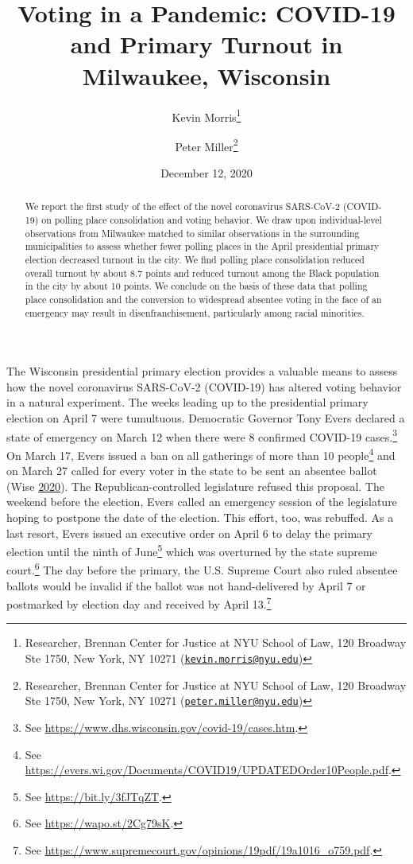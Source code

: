 \documentclass[
  12pt,
]{article}
\title{Voting in a Pandemic: COVID-19 and Primary Turnout in Milwaukee, Wisconsin}
\author{Kevin Morris\footnote{Researcher, Brennan Center for Justice at NYU School of Law, 120 Broadway Ste 1750, New York, NY 10271 (\href{mailto:kevin.morris@nyu.edu}{\nolinkurl{kevin.morris@nyu.edu}})} \and Peter Miller\footnote{Researcher, Brennan Center for Justice at NYU School of Law, 120 Broadway Ste 1750, New York, NY 10271 (\href{mailto:peter.miller@nyu.edu}{\nolinkurl{peter.miller@nyu.edu}})}}
\date{December 12, 2020}
\begin{document}
\maketitle
\begin{abstract}
We report the first study of the effect of the novel coronavirus SARS-CoV-2 (COVID-19) on polling place consolidation and voting behavior. We draw upon individual-level observations from Milwaukee matched to similar observations in the surrounding municipalities to assess whether fewer polling places in the April presidential primary election decreased turnout in the city. We find polling place consolidation reduced overall turnout by about 8.7 points and reduced turnout among the Black population in the city by about 10 points. We conclude on the basis of these data that polling place consolidation and the conversion to widespread absentee voting in the face of an emergency may result in disenfranchisement, particularly among racial minorities.
\end{abstract}

\pagebreak

\doublespacing

The Wisconsin presidential primary election provides a valuable means to assess how the novel coronavirus SARS-CoV-2 (COVID-19) has altered voting behavior in a natural experiment. The weeks leading up to the presidential primary election on April 7 were tumultuous. Democratic Governor Tony Evers declared a state of emergency on March 12 when there were 8 confirmed COVID-19 cases.\footnote{See \url{https://www.dhs.wisconsin.gov/covid-19/cases.htm}.} On March 17, Evers issued a ban on all gatherings of more than 10 people\footnote{See \url{https://evers.wi.gov/Documents/COVID19/UPDATEDOrder10People.pdf}.} and on March 27 called for every voter in the state to be sent an absentee ballot (Wise \protect\hyperlink{ref-Wise2020}{2020}). The Republican-controlled legislature refused this proposal. The weekend before the election, Evers called an emergency session of the legislature hoping to postpone the date of the election. This effort, too, was rebuffed. As a last resort, Evers issued an executive order on April 6 to delay the primary election until the ninth of June\footnote{See \url{https://bit.ly/3fJTqZT}.} which was overturned by the state supreme court.\footnote{See \url{https://wapo.st/2Cg79sK}.} The day before the primary, the U.S. Supreme Court also ruled absentee ballots would be invalid if the ballot was not hand-delivered by April 7 or postmarked by election day and received by April 13.\footnote{See \url{https://www.supremecourt.gov/opinions/19pdf/19a1016_o759.pdf}.}
\end{document}
